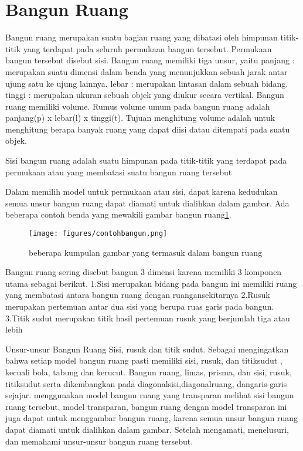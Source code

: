	
\section{Bangun Ruang}
Bangun ruang merupakan suatu bagian ruang yang dibatasi oleh himpunan titik-titik yang terdapat pada seluruh permukaan bangun tersebut. 
Permukaan bangun tersebut disebut sisi. Bangun ruang memiliki tiga unsur, yaitu 
panjang : merupakan suatu dimensi dalam benda yang menunjukkan sebuah jarak antar ujung satu ke ujung lainnya.
lebar   : merupakan lintasan dalam sebuah bidang.
tinggi  : merupakan ukuran sebuah objek yang diukur secara vertikal.
Bangun ruang memiliki volume. Rumus volume umum pada bangun ruang adalah panjang(p) x lebar(l) x tinggi(t).
Tujuan menghitung volume adalah untuk menghitung berapa banyak ruang yang dapat diisi datau ditempati pada suatu objek.

Sisi bangun ruang adalah suatu himpunan pada titik-titik yang terdapat pada permukaan atau yang membatasi suatu bangun ruang tersebut \cite{umami2013eksperimentasi}

Dalam memilih model untuk permukaan atau sisi, dapat karena kedudukan semua unsur bangun ruang dapat diamati untuk dialihkan dalam gambar\cite{suharjana2008mengenal}. 
Ada beberapa contoh benda yang mewakili gambar bangun ruang\ref{contohbangun}.
\begin{figure}[ht]
    \centerline{\texttt{[image: figures/contohbangun.png]}}
    \caption{beberapa kumpulan gambar yang termasuk dalam bangun ruang}
    \label{contohbangun}
    \end{figure}
 
Bangun ruang sering  disebut bangun 3 dimensi karena memiliki 3 komponen utama sebagai berikut.
1.Sisi  merupakan bidang pada bangun ini memiliki ruang yang membatasi antara bangun ruang dengan ruangansekitarnya 
2.Rusuk merupakan pertemuan antar dua sisi yang berupa ruas garis pada bangun.
3.Titik sudut merupakan titik hasil pertemuan rusuk yang berjumlah tiga atau lebih

Unsur-unsur Bangun Ruang Sisi, rusuk dan titik sudut. Sebagai mengingatkan bahwa setiap model bangun ruang pasti memiliki sisi, rusuk, dan titiksudut , kecuali bola, tabung dan kerucut.
Bangun ruang, limas, prisma, dan sisi, rusuk, titiksudut serta dikembangkan pada diagonalsisi,diagonalruang, dangaris-garis sejajar.
menggunakan model bangun ruang yang transparan  melihat sisi bangun ruang tersebut, model transparan, bangun ruang dengan model transparan ini juga dapat untuk menggambar bangun ruang, karena semua unsur bangun ruang dapat diamati untuk dialihkan dalam gambar. Setelah mengamati, 
menelusuri, dan memahami unsur-unsur bangun ruang tersebut.

